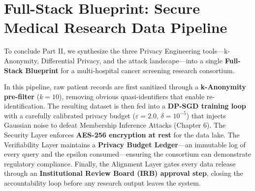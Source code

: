 \section{Full-Stack Blueprint: Secure Medical Research Data Pipeline}
\label{sec:blueprint_medical_research}

To conclude Part II, we synthesize the three Privacy Engineering tools---k-Anonymity, Differential Privacy, and the attack landscape---into a single \textbf{Full-Stack Blueprint} for a multi-hospital cancer screening research consortium.

In this pipeline, raw patient records are first sanitized through a \textbf{k-Anonymity pre-filter} ($k=10$), removing obvious quasi-identifiers that enable re-identification. The resulting dataset is then fed into a \textbf{DP-SGD training loop} with a carefully calibrated privacy budget ($\varepsilon = 2.0$, $\delta = 10^{-5}$) that injects Gaussian noise to defeat Membership Inference Attacks (Chapter 6). The Security Layer enforces \textbf{AES-256 encryption at rest} for the data lake. The Verifiability Layer maintains a \textbf{Privacy Budget Ledger}---an immutable log of every query and the epsilon consumed---ensuring the consortium can demonstrate regulatory compliance. Finally, the Alignment Layer gates every data release through an \textbf{Institutional Review Board (IRB) approval step}, closing the accountability loop before any research output leaves the system.


